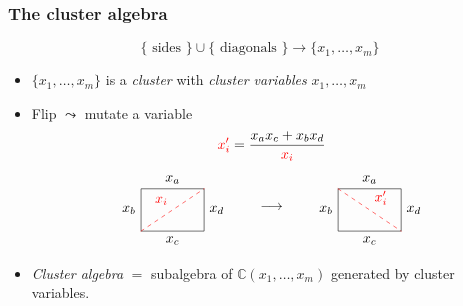 \documentclass[aspectratio=169]{beamer}
\begin{document}
\begin{frame}
	\frametitle{The cluster algebra}

	\begin{equation*}
		\{\text{ sides }\} \cup \{ \text{ diagonals }\} \longrightarrow \{x_1, \dotsc, x_m\}
	\end{equation*}
	\vspace{-1em}
	\begin{itemize}
		\item $\{x_1, \dotsc, x_m\}$ is a \emph{cluster} with \emph{cluster variables} $x_1, \dotsc, x_m$\pause
		\item Flip $\leadsto$ mutate a variable\pause
		      \begin{equation*}
			      {\color{red} x_i'} = \frac{x_a x_c + x_b x_d}{\color{red} x_i}
		      \end{equation*}
		      \begin{equation*}
			      \begin{tikzpicture}[baseline]
				      \node[name=r, draw, inner sep = 3.5ex, xscale = 1.5]     {};
				      \node[above] at  (r.north) {$x_a$};
				      \node[left]  at  (r.west) {$x_b$};
				      \node[below] at  (r.south) {$x_c$};
				      \node[right] at  (r.east) {$x_d$};
				      \draw[red, dashed] (r.south west) edge["$x_i$"] (r.north east);
			      \end{tikzpicture}
			      \qquad\longrightarrow\qquad
			      \begin{tikzpicture}[baseline]
				      \node[name=r, draw, inner sep = 3.5ex, xscale = 1.5]        {};
				      \node[above] at  (r.north) {$x_a$};
				      \node[left]  at  (r.west) {$x_b$};
				      \node[below] at  (r.south) {$x_c$};
				      \node[right] at  (r.east) {$x_d$};
				      \draw[red, dashed] (r.north west) edge["$x_i'$"] (r.south east);
			      \end{tikzpicture}
		      \end{equation*}
		      \pause
		\item \emph{Cluster algebra} $=$ subalgebra of $\mathbb{C}(x_1, \dotsc, x_m)$ generated by cluster variables.
	\end{itemize}

\end{frame}
\end{document}
